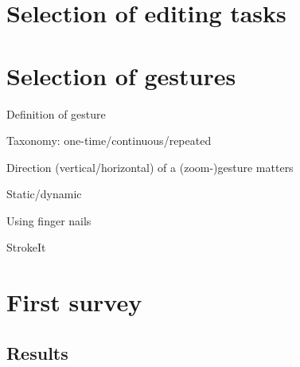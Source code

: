 \documentclass{aes130}
\begin{document}
\section{Selection of editing tasks} \label{sec:EditingTasks}



\section{Selection of gestures} \label{sec:Gestures}

\newcommand{\quarterpic}[1][]{\texttt{[image: ../../de/Befragung/img/\#1]}}
\newcommand{\sixthpic}[1][]{\texttt{[image: ../../de/Befragung/img/\#1]}}

Definition of gesture

Taxonomy: one-time/continuous/repeated

Direction (vertical/horizontal) of a (zoom-)gesture matters

Static/dynamic

Using finger nails

StrokeIt


\section{First survey} \label{sec:Survey1}


\subsection{Results} \label{sec:Survey1Results}
\end{document}
